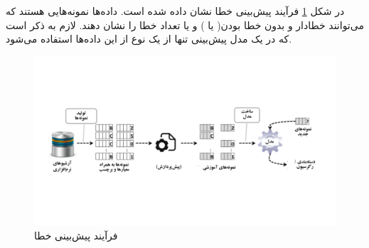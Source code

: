 در شکل \ref{fig:prediction-process} فرآیند پیش‌بینی خطا نشان داده شده است. داده‌ها نمونه‌هایی هستند که می‌توانند خطادار  و بدون  خطا  بودن(    یا    ) و یا تعداد خطا را نشان دهند. لازم به ذکر است که در یک مدل پیش‌بینی تنها از یک نوع از این داده‌ها استفاده می‌شود.
\begin{figure}[H]
	\centering
	\includegraphics[trim={2cm 5cm 2cm 5cm},clip,width=1.0\textwidth]{img/prediction-process.pdf}
	 \caption{فرآیند پیش‌بینی خطا \cite{nam2014survey}}
	\label{fig:prediction-process}
\end{figure}